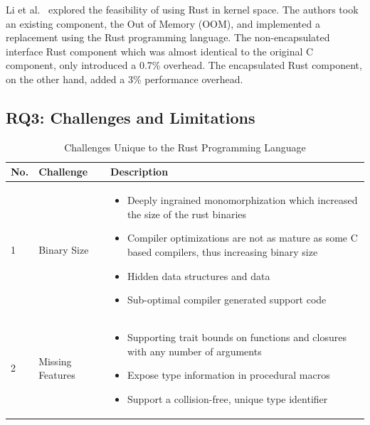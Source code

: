\documentclass[sigconf]{acmart}
\begin{document}
Li et al.~\cite{Li2024-be} explored the feasibility of using Rust in kernel space. The authors took
an existing component, the Out of Memory (OOM), and implemented a replacement using the Rust
programming language. The non-encapsulated interface Rust component which was almost identical to
the original C component, only introduced a 0.7\% overhead. The encapsulated Rust component, on the
other hand, added a 3\% performance overhead.

\subsection{RQ3: Challenges and Limitations}

\begin{table}
    \caption{Challenges Unique to the Rust Programming Language}
    \begin{tabular}{p{1cm} p{5cm} p{10cm}}
        \hline
        No. & Challenge & Description\\
        \hline
        1 & Binary Size~\cite{Ayers2022-sf}  &
        \begin{itemize}
            \item Deeply ingrained monomorphization which increased the size of the rust binaries
            \item Compiler optimizations are not as mature as some C based compilers, thus increasing binary size
            \item Hidden data structures and data
            \item Sub-optimal compiler generated support code
        \end{itemize}
        \\
        \hline
        2 & Missing Features~\cite{Burtsev2021-mh} &
        \begin{itemize}
            \item Supporting trait bounds on functions and closures with any number of arguments
            \item Expose type information in procedural macros
            \item Support a collision-free, unique type identifier


\end{itemize}
\end{tabular}
\end{table}
\end{document}
